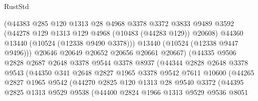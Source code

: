 \begin{lexlean}{RustStd}
\begin{coremodule}
                            (@44383
                              @285
                              @120
                              @1313
                              @28
                              @4968
                              @3378
                              @3372
                              @3833
                              @9489
                              @3592
                              (@44278 @129 @1313 @129 @4968 (@10483 (@44283 @129)) @20608)
                              @44360
                              @13440
                              (@10524 (@12338 @9490 @3378)))
                            @13440
                            (@10524 (@12338 @9447 @9496)))
                          @20646
                          @20649
                          @20652
                          @20656
                          @20661
                          @20667)
                        (@44335
                          @9506
                          @2828
                          @2687
                          @2648
                          @3378
                          @9544
                          @3378
                          @8937
                          (@44344
                            @2828
                            @2648
                            @3378
                            @9543
                            (@44350
                              @341
                              @2648
                              @2827
                              @1965
                              @3378
                              @9542
                              @7611
                              @10600
                              (@44265
                                @2827
                                @1965
                                @9542
                                (@44270
                                  @2825
                                  @120
                                  @1313
                                  @28
                                  @9540
                                  @3372
                                  (@44395
                                    @2825
                                    @1313
                                    @9529
                                    @9538
                                    (@44400
                                      @2824
                                      @1966
                                      @1313
                                      @9529
                                      @9536
                                      @8051

\end{coremodule}
\end{lexlean}
